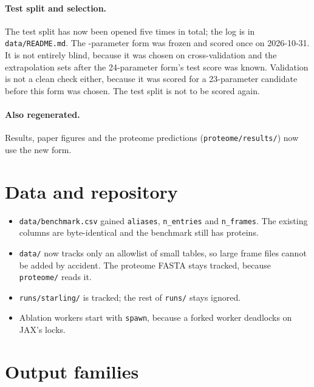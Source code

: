 \documentclass[11pt]{article}
\begin{document}
\paragraph{Test split and selection.} The test split has now been opened five times in total; the log is in \texttt{data/README.md}. The
-parameter form was frozen and scored once on 2026-10-31. It is not entirely blind, because it was chosen on cross-validation and
the extrapolation sets after the 24-parameter form's test score was known. Validation is not a clean check either, because it was scored for a
23-parameter candidate before this form was chosen. The test split is not to be scored again.

\paragraph{Also regenerated.} Results, paper figures and the proteome predictions (\texttt{proteome/results/}) now use the new form.

\section{Data and repository}
\begin{itemize}
\item \texttt{data/benchmark.csv} gained \texttt{aliases}, \texttt{n\_entries} and \texttt{n\_frames}. The existing columns are byte-identical and
  the benchmark still has  proteins.
\item \texttt{data/} now tracks only an allowlist of small tables, so large frame files cannot be added by accident. The proteome FASTA stays
  tracked, because \texttt{proteome/} reads it.
\item \texttt{runs/starling/} is tracked; the rest of \texttt{runs/} stays ignored.
\item Ablation workers start with \texttt{spawn}, because a forked worker deadlocks on JAX's locks.
\end{itemize}

\section{Output families}\label{sec:fam}
\end{document}
